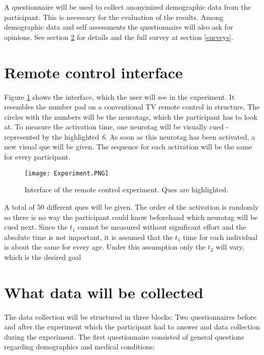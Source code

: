                 A questionnaire will be used to collect anonymized demographic data from the participant. This is necessary for the evaluation of the results. Among demographic data and self assessments the questionnaire will also ask for opinions. See section \ref*{datacollection} for details and the full survey at section \ref*{surveys}.

        \section{Remote control interface}
        
            Figure \ref*{gui-remote} shows the interface, which the user will see in the experiment. It resembles the number pad on a conventional TV remote control in structure. The circles with the numbers will be the neurotags, which the participant has to look at. To measure the activation time, one neurotag will be visually cued - represented by the highlighted \textit{6}. As soon as this neurotag has been activated, a new visual que will be given. The sequence for each activation will be the same for every participant. 
            
            \begin{figure}[h]     %
                \centering
                \texttt{[image: Experiment.PNG]} 
                \caption{Interface of the remote control experiment. Ques are highlighted.}\label{gui-remote}
            \end{figure} 
            
            A total of 50 different ques will be given. The order of the activation is randomly so there is no way the participant could know beforehand which neurotag will be cued next. Since the $t_{1}$ cannot be measured without significant effort and the absolute time is not important, it is assumed that the $t_{1}$ time for each individual is about the same for every age. Under this assumption only the $t_{2}$ will vary, which is the desired goal

        \section{What data will be collected}\label{datacollection}

            The data collection will be structured in three blocks: Two questionnaires before and after the experiment which the participant had to answer and data collection during the experiment. The first questionnaire consisted of general questions regarding demographics and medical conditions:

